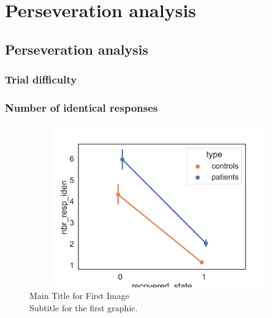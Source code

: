 \renewcommand{\chaptername}{Chapter} 
\chapter{Perseveration analysis}\label{chap9}

\section{Perseveration analysis} 
\subsection{Trial difficulty} 

\subsection{Number of identical responses} 
\begin{figure}[H]
    \centering
    \includegraphics[width=12cm,height=7cm]{MainLayout/Images/chapter9/nbr_resp_iden.jpg}
    \caption{Main Title for First Image \\ \small Subtitle for the first graphic.}
    \label{fig:kernel_comparison_methods}
\end{figure}

